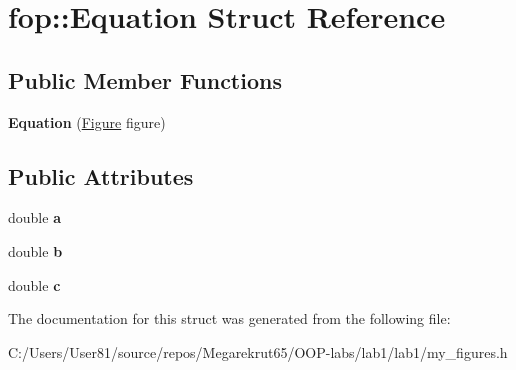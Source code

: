 \hypertarget{structfop_1_1_equation}{}\section{fop\+:\+:Equation Struct Reference}
\label{structfop_1_1_equation}
\subsection*{Public Member Functions}
\begin{DoxyCompactItemize}
\item 
\mbox{\label{structfop_1_1_equation_a93886a166390114aa62609af6ddd1d72}} 
{\bfseries Equation} (\mbox{\hyperlink{classfop_1_1_figure}{Figure}} figure)
\end{DoxyCompactItemize}
\subsection*{Public Attributes}
\begin{DoxyCompactItemize}
\item 
\mbox{\label{structfop_1_1_equation_a9cc4610dcc3a68de1def70a8573cf75f}} 
double {\bfseries a}
\item 
\mbox{\label{structfop_1_1_equation_a6bf704c5c87c9a321c18869f634a5ff1}} 
double {\bfseries b}
\item 
\mbox{\label{structfop_1_1_equation_a795ea1202f12b407544c305d79e39872}} 
double {\bfseries c}
\end{DoxyCompactItemize}


The documentation for this struct was generated from the following file\+:\begin{DoxyCompactItemize}
\item 
C\+:/\+Users/\+User81/source/repos/\+Megarekrut65/\+O\+O\+P-\/labs/lab1/lab1/my\+\_\+figures.\+h\end{DoxyCompactItemize}
